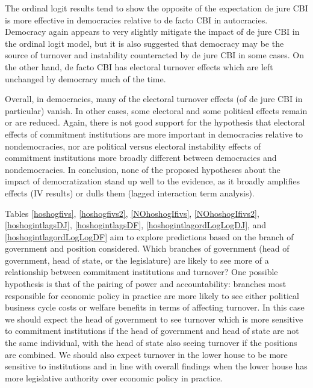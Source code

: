 \documentclass{article}
\begin{document}
    The ordinal logit results tend to show the opposite of the expectation de jure CBI is more effective in democracies relative to de facto CBI in autocracies. Democracy again appears to very slightly mitigate the impact of de jure CBI in the ordinal logit model, but it is also suggested that democracy may be the source of turnover and instability counteracted by de jure CBI in some cases. On the other hand, de facto CBI has electoral turnover effects which are left unchanged by democracy much of the time.

    Overall, in democracies, many of the electoral turnover effects (of de jure CBI in particular) vanish. In other cases, some electoral and some political effects remain or are reduced. Again, there is not good support for the hypothesis that electoral effects of commitment institutions are more important in democracies relative to nondemocracies, nor are political versus electoral instability effects of commitment institutions more broadly different between democracies and nondemocracies. In conclusion, none of the proposed hypotheses about the impact of democratization stand up well to the evidence, as it broadly amplifies effects (IV results) or dulls them (lagged interaction term analysis).

    Tables \ref{hoshogfivs}, \ref{hoshogfivs2}, \ref{NOhoshogIfivs}, \ref{NOhoshogIfivs2}, \ref{hoshogintlagsDJ}, \ref{hoshogintlagsDF}, \ref{hoshogintlagordLogLogDJ}, and \ref{hoshogintlagordLogLogDF} aim to explore predictions based on the branch of government and position considered. Which branches of government (head of government, head of state, or the legislature) are likely to see more of a relationship between commitment institutions and turnover? One possible hypothesis is that of the pairing of power and accountability: branches most responsible for economic policy in practice are more likely to see either political business cycle costs or welfare benefits in terms of affecting turnover. In this case we should expect the head of government to see turnover which is more sensitive to commitment institutions if the head of government and head of state are not the same individual, with the head of state also seeing turnover if the positions are combined. We should also expect turnover in the lower house to be more sensitive to institutions and in line with overall findings when the lower house has more legislative authority over economic policy in practice.
\end{document}
